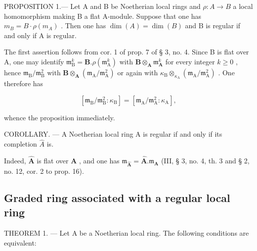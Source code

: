 PROPOSITION 1.--- Let A and B be Noetherian local rings and \(\rho:A\to B\) a local homomorphism making B a flat A-module. Suppose that one has \(m_{B} = B \cdot \rho(m_{A})\) . Then one has \(\dim(A) = \dim(B)\) and B is regular if and only if A is regular.

The first assertion follows from cor. 1 of prop. 7 of § 3, no. 4. Since B is flat over A, one may identify \(\mathfrak{m}_{\mathrm{B}}^{k} = \mathbf{B}.\rho (\mathfrak{m}_{\mathrm{A}}^{k})\) with \(\mathbf{B}\otimes_{\mathbf{A}}\mathfrak{m}_{\mathbf{A}}^{k}\) for every integer \(k\geqslant 0\) , hence \(\mathfrak{m}_{\mathrm{B}} / \mathfrak{m}_{\mathrm{B}}^{2}\) with \(\mathbf{B}\otimes_{\mathbf{A}}(\mathfrak{m}_{\mathrm{A}} / \mathfrak{m}_{\mathrm{A}}^{2})\) or again with \(\kappa_{\mathrm{B}}\otimes_{\kappa_{\mathrm{A}}}(\mathfrak{m}_{\mathrm{A}} / \mathfrak{m}_{\mathrm{A}}^{2})\) . One therefore has

\[
\left[ \mathfrak {m} _ {\mathrm{B}} / \mathfrak {m} _ {\mathrm{B}} ^ {2}: \kappa_ {\mathrm{B}} \right] = \left[ \mathfrak {m} _ {\mathrm{A}} / \mathfrak {m} _ {\mathrm{A}} ^ {2}: \kappa_ {\mathrm{A}} \right],\tag{2}
\]

whence the proposition immediately.

COROLLARY. --- A Noetherian local ring A is regular if and only if its completion \(\hat{A}\) is.

Indeed, \(\hat{\mathbf{A}}\) is flat over \(\mathbf{A}\) , and one has \(\mathfrak{m}_{\hat{\mathbf{A}}} = \hat{\mathbf{A}}. \mathfrak{m}_{\mathbf{A}}\) (III, § 3, no. 4, th. 3 and § 2, no. 12, cor. 2 to prop. 16).

\subsection{Graded ring associated with a regular local ring}

THEOREM 1. --- Let A be a Noetherian local ring. The following conditions are equivalent:

